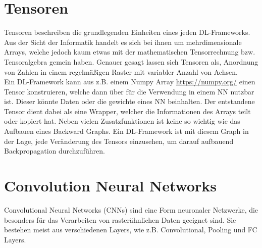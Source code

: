 \section{Tensoren}
Tensoren beschreiben die grundlegenden Einheiten eines jeden DL-Frameworks. Aus der Sicht der Informatik handelt es sich bei ihnen um mehrdimensionale Arrays, welche jedoch kaum etwas mit der mathematischen Tensorrechnung bzw. Tensoralgebra gemein haben. \cite[S. 67]{DRL_Lapan}
Genauer gesagt lassen sich Tensoren als, Anordnung von Zahlen in einem regelmäßigen Raster mit variabler Anzahl von Achsen. \cite[S. 35]{DL}\\
Ein DL-Framework kann aus z.B. einem Numpy Array \url{https://numpy.org/} einen Tensor konstruieren, welche dann über für die Verwendung in einem NN nutzbar ist. Dieser könnte Daten oder die gewichte eines NN beinhalten. Der entstandene Tensor dient dabei als eine Wrapper, welcher die Informationen des Arrays teilt oder kopiert hat. Neben vielen Zusatzfunktionen ist keine so wichtig wie das Aufbauen eines Backward Graphs. Ein DL-Framework ist mit diesem Graph in der Lage, jede Veränderung des Tensors einzusehen, um darauf aufbauend Backpropagation durchzuführen. \cite[S. 72 ff.]{DRL_Lapan}

\section{Convolution Neural Networks}
Convolutional Neural Networks (CNNs) sind eine Form neuronaler Netzwerke, die besonders für das Verarbeiten von rasterähnlichen Daten geeignet sind. Sie bestehen meist aus verschiedenen Layers, wie z.B. Convolutional, Pooling und FC Layers.

